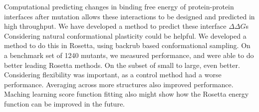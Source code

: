 Computational predicting changes in binding free energy of protein-protein interfaces after mutation allows these interactions to be designed and predicted in high throughput.
We have developed a method to predict these interface $\Delta\Delta G$s
Considering natural conformational plasticity could be helpful.
We developed a method to do this in Rosetta, using backrub based conformational sampling.
On a benchmark set of 1240 mutants, we measured performance, and were able to do better leading Rosetta methods.
On the subset of small to large, even better.
Considering flexibility was important, as a control method had a worse performance.
Averaging across more structures also improved performance.
Maching learning score function fitting also might show how the Rosetta energy function can be improved in the future.
